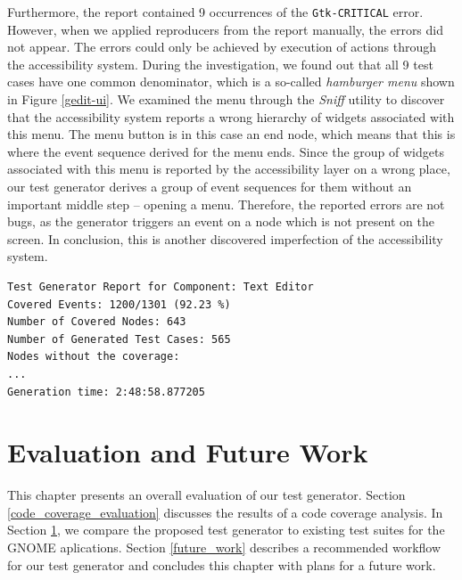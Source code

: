 Furthermore, the report contained 9 occurrences of the \texttt{Gtk-CRITICAL} error. However, when we applied reproducers from the report manually, the errors did not appear. The errors could only be achieved by execution of actions through the accessibility system. During the investigation, we found out that all 9 test cases have one common denominator, which is a so-called \textit{hamburger menu} shown in Figure \ref{gedit-ui}. We examined the menu through the \textit{Sniff} utility to discover that the accessibility system reports a wrong hierarchy of widgets associated with this menu. The menu button is in this case an end node, which means that this is where the event sequence derived for the menu ends. Since the group of widgets associated with this menu is reported by the accessibility layer on a wrong place, our test generator derives a group of event sequences for them without an important middle step -- opening a menu. Therefore, the reported errors are not bugs, as the generator triggers an event on a node which is not present on the screen. In conclusion, this is another discovered imperfection of the accessibility system.


\begin{lstlisting}[caption={The final test generator report for Gedit},label={gedit-report}]
Test Generator Report for Component: Text Editor
Covered Events: 1200/1301 (92.23 %)
Number of Covered Nodes: 643
Number of Generated Test Cases: 565
Nodes without the coverage:
...
Generation time: 2:48:58.877205
\end{lstlisting}








\chapter{Evaluation and Future Work}\label{comparison}
This chapter presents an overall evaluation of our test generator. Section \ref{code_coverage_evaluation} discusses the results of a code coverage analysis. In Section \ref{comparison}, we compare the proposed test generator to existing test suites for the GNOME aplications. Section \ref{future_work} describes a recommended workflow for our test generator and concludes this chapter with plans for a future work. 

